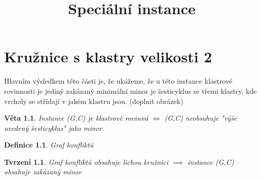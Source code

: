 \documentclass[12pt,a4report]{report}
\title {Speciální instance}
\newtheorem{main_tvrz1}{Věta}
\newtheorem{def1}{Definice}
\newtheorem{tvrz2}{Tvrzení}
\begin{document}
\maketitle

\chapter {Kružnice s klastry velikosti 2}
Hlavním výsledkem této části je, že ukážeme, že u této instance klastrové rovinnosti je jediný zakázaný minimální minor je šesticyklus se třemi klastry, kde vrcholy se střídají v jakém klastru jsou. (doplnit obrázek)

\begin{main_tvrz1}
Instance (G,C) je klastrově rovinná $\iff$ (G,C) neobsahuje "výše uvedený šesticyklus" jako minor.
\end{main_tvrz1}

\begin{def1}
Graf konfliktů \\

\end{def1}

\begin{tvrz2}
Graf konfliktů obsahuje lichou kružnici $\implies$ instance (G,C) obsahuje zakázaný minor
\end{tvrz2}
\end{document}
